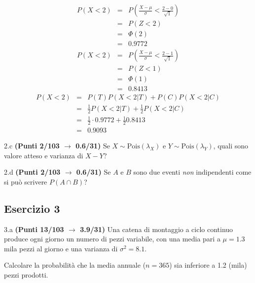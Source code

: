 \documentclass[
  11pt,
]{book}
\theoremstyle{mytheoremstyle}
\theoremstyle{mydefstyle}
\newenvironment{sol}
  {
  \begin{tcolorbox}[enhanced,breakable,arc=0.1mm,boxrule=1pt,colback=white,colframe=iblue,
  title=\bf \fontfamily{lmss}\selectfont \hspace{.5 cm} Soluzione,drop fuzzy shadow]

}{
\end{tcolorbox}
  }
\begin{document}
\begin{sol}
\begin{eqnarray*}
      P( X   <   2 ) 
        &=& P\left(  \frac { X  -  \mu }{ \sigma }  <  \frac { 2  -  0 }{\sqrt{ 1 }} \right)  \\
                 &=& P\left(  Z   <   2 \right) \\    
                 &=&  \Phi( 2 ) \\ &=&  0.9772 
      \end{eqnarray*}\begin{eqnarray*}
      P( X   <   2 ) 
        &=& P\left(  \frac { X  -  \mu }{ \sigma }  <  \frac { 2  -  1 }{\sqrt{ 1 }} \right)  \\
                 &=& P\left(  Z   <   1 \right) \\    
                 &=&  \Phi( 1 ) \\ &=&  0.8413 
      \end{eqnarray*}
\begin{eqnarray*}
P(X<2) &=& P(T)P(X<2|T)+P(C)P(X<2|C)\\
&=& \frac 12P(X<2|T)+\frac 12P(X<2|C)\\
&=& \frac 12\cdot 0.9772+\frac 12 0.8413\\
&=& 0.9093
\end{eqnarray*}

\end{sol}

2.c \textbf{(Punti 2/103 \(\rightarrow\) 0.6/31)} Se \(X\sim\text{Pois}(\lambda_X)\) e \(Y\sim\text{Pois}(\lambda_Y)\), quali sono valore atteso e varianza
di \(X-Y\)?

2.d \textbf{(Punti 2/103 \(\rightarrow\) 0.6/31)} Se \(A\) e \(B\) sono due eventi \emph{non} indipendenti come si può scrivere \(P(A\cap B)\)?

\subsection{Esercizio 3}\label{esercizio-3-28}

3.a \textbf{(Punti 13/103 \(\rightarrow\) 3.9/31)} Una catena di montaggio a ciclo continuo produce ogni giorno un numero di pezzi variabile, con una media pari a
\(\mu=1.3\) mila pezzi al giorno e una varianza di \(\sigma^2=8.1\).

Calcolare la probabilità che la media annuale (\(n=365\)) sia inferiore a 1.2 (mila) pezzi prodotti.
\end{document}
